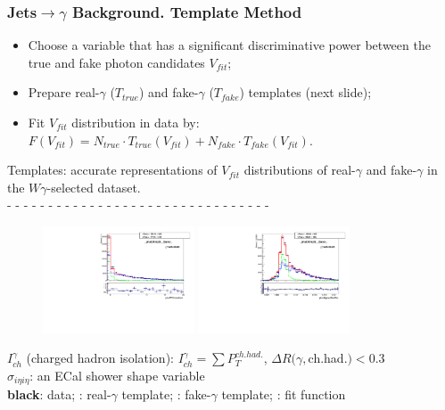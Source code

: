 \begin{frame}\frametitle{Jets$\rightarrow \gamma$ Background. Template Method}
 \scriptsize
  \begin{itemize}
    \item Choose a variable that has a significant discriminative power between the true and fake photon candidates $V_{fit}$;
    \item Prepare real-$\gamma$ ($T_{true}$) and fake-$\gamma$ ($T_{fake}$) templates {\tiny{(next slide)}};
    \item Fit $V_{fit}$ distribution in data by: $F(V_{fit})=N_{true} \cdot T_{true}(V_{fit}) + N_{fake} \cdot T_{fake}(V_{fit})$.
  \end{itemize}
\tiny
Templates: accurate representations of $V_{fit}$ distributions of real-$\gamma$ and fake-$\gamma$ in the $W\gamma$-selected dataset.\\
- - - - - - - - - - - - - - - - - - - - - - - - - - - - - - - - \\
  \begin{figure}[htb]
    \begin{center}
       \includegraphics[width=0.40\textwidth]{../figs/figs_v11/MUON_WGamma/TemplateFits/c_TEMPL_CHISO_UNblind__phoEt15to20__Barrel__RooFit.pdf} \includegraphics[width=0.40\textwidth]{../figs/figs_v11/MUON_WGamma/TemplateFits/c_TEMPL_SIHIH_UNblind__phoEt15to20__Barrel__RooFit.pdf}
    \end{center}
  \end{figure}
\scriptsize
$I_{ch}^{\gamma}$ (charged hadron isolation):  $I_{ch}^{\gamma} = \sum P_T^{ch.had.}$, $\Delta R(\gamma,$ch.had.$)<$0.3\\
$\sigma_{i\eta i\eta}$: an ECal shower shape variable\\
\tiny
{\bfseries{black}}: data; {\bfseries\color{green}{green}}: real-$\gamma$ template; {\bfseries\color{blue}{blue}}: fake-$\gamma$ template; {\bfseries\color{red}{red}}: fit function
\end{frame}

